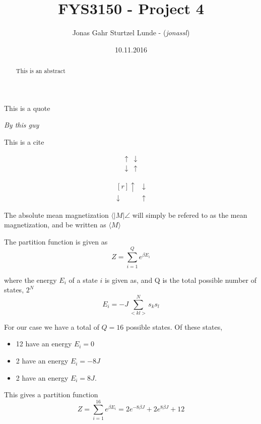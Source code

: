 \documentclass[10pt,a4paper]{article}
\begin{document}
\title{FYS3150 - Project 4}
\author{
	\begin{tabular}{rl}
		Jonas Gahr Sturtzel Lunde - (\textit{jonassl})\\
	\end{tabular}}
\date{10.11.2016}
\maketitle



\setlength{\epigraphwidth}{0.75\textwidth}
\renewcommand{\epigraphflush}{center}
\renewcommand{\beforeepigraphskip}{50pt}
\renewcommand{\afterepigraphskip}{100pt}
\renewcommand{\epigraphsize}{\normalsize}
\epigraph{This is a quote}
	{\textit{By this guy}}



\begin{abstract}
\noindent
This is an abstract
\end{abstract}
\pagebreak



This is a cite\cite{lecture_notes}

\[
\begin{matrix*}
\uparrow & \downarrow \\
\downarrow & \uparrow
\end{matrix*}
\]

\[
\begin{matrix*}[r]
\uparrow & \downarrow \\
\downarrow & \uparrow
\end{matrix*}
\]


The absolute mean magnetization $\langle |M| \angle$ will simply be refered to as the mean magnetization, and be written as $\langle M \rangle$

The partition function is given as
\begin{equation}
Z = \sum\limits_{i=1}^Q e^{\beta E_i}
\end{equation}

where the energy $E_i$ of a state $i$ is given as, and Q is the total possible number of states, $2^N$
\begin{equation}
E_i = -J \sum\limits_{<kl>}^N s_k s_l
\end{equation}

For our case we have a total of $Q = 16$ possible states. Of these states,
\begin{itemize}
\item 12 have an energy $E_i = 0$
\item 2 have an energy $E_i = -8J$
\item 2 have an energy $E_i = 8J$.
\end{itemize}
This gives a partition function
\begin{equation}
Z = \sum\limits_{i=1}^16 e^{\beta E_i} = 2e^{-8\beta J} + 2e^{8\beta J} + 12
\end{equation}
\end{document}

